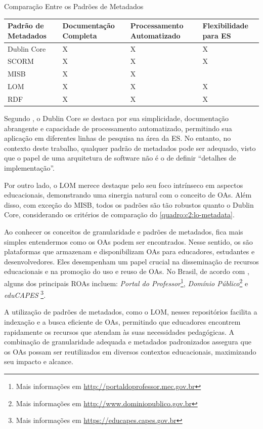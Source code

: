 \begin{quadro}[htb]
\caption{Comparação Entre os Padrões de Metadados} 
\label{quadro:c2:lo-metadata}
\begin{tabular}{P{3.5cm}|P{3cm}|P{3cm}|P{3cm}}\hline
\textbf{Padrão de Metadados} & \textbf{Documentação Completa} & \textbf{Processamento Automatizado} & \textbf{Flexibilidade para ES} \\ \hline
Dublin Core & X & X & X \\  \hline
SCORM & X & X & X \\ \hline
MISB & X & X & \\ \hline
LOM & X & X & X \\ \hline
RDF & X & X & X \\ \hline
\end{tabular}
\end{quadro}

Segundo , o Dublin Core se destaca por sua simplicidade, documentação abrangente e capacidade de processamento automatizado, permitindo sua aplicação em diferentes linhas de pesquisa na área da ES. No entanto, no contexto deste trabalho, qualquer padrão de metadados pode ser adequado, visto que o papel de uma arquitetura de software não é o de definir ``detalhes de implementação''. 

Por outro lado, o LOM merece destaque pelo seu foco intrínseco em aspectos educacionais, demonstrando uma sinergia natural com o conceito de OAs. Além disso, com exceção do MISB, todos os padrões são tão robustos quanto o Dublin Core, considerando os critérios de comparação do \autoref{quadro:c2:lo-metadata}.

Ao conhecer os conceitos de granularidade e padrões de metadados, fica mais simples entendermos como os OAs podem ser encontrados. Nesse sentido, os  são plataformas que armazenam e disponibilizam OAs para educadores, estudantes e desenvolvedores. Eles desempenham um papel crucial na disseminação de recursos educacionais e na promoção do uso e reuso de OAs. No Brasil, de acordo com , alguns dos principais ROAs incluem: \textit{Portal do Professor}\footnote{Mais informações em \url{http://portaldoprofessor.mec.gov.br}}, \textit{Domínio Público}\footnote{Mais informações em \url{http://www.dominiopublico.gov.br}} e \textit{eduCAPES} \footnote{Mais informações em \url{https://educapes.capes.gov.br}}.

A utilização de padrões de metadados, como o LOM, nesses repositórios facilita a indexação e a busca eficiente de OAs, permitindo que educadores encontrem rapidamente os recursos que atendam às suas necessidades pedagógicas. A combinação de granularidade adequada e metadados padronizados assegura que os OAs possam ser reutilizados em diversos contextos educacionais, maximizando seu impacto e alcance.

